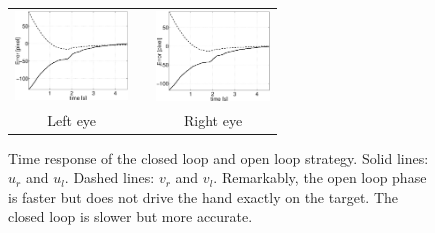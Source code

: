   \begin{figure}
  \begin{center}
	\begin{tabular}{ccc}
	  \parbox{30mm}{\includegraphics[width=30mm]{Figure/LeftEyeOpenClosedLoopTimeResponse.eps}}  & \hspace{.1cm} &
	  \parbox{30mm}{\includegraphics[width=30mm]{Figure/RightEyeOpenClosedLoopTimeResponse.eps}}
	  \\
	  \parbox{30mm}{\centering Left eye } & \hspace{.1cm} & \parbox{50mm}{\centering Right eye }
  \end{tabular}
\end{center}
\caption{Time response of the closed loop and open loop strategy. Solid lines: $u_r$ and $u_l$. Dashed lines: $v_r$ and $v_l$. Remarkably, the open loop phase is faster but does not drive the hand exactly on the target. The closed loop is slower but more accurate.}\label{Fig:TimeResponseOpenClosedLoop}
\end{figure}

